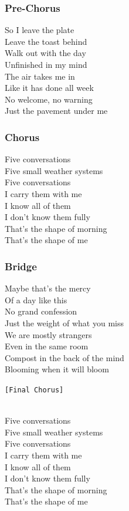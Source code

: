 \subsubsection{Pre-Chorus}\label{pre-chorus-3}

So I leave the plate\\
Leave the toast behind\\
Walk out with the day\\
Unfinished in my mind\\
The air takes me in\\
Like it has done all week\\
No welcome, no warning\\
Just the pavement under me

\subsubsection{Chorus}\label{chorus-11}

Five conversations\\
Five small weather systems\\
Five conversations\\
I carry them with me\\
I know all of them\\
I don't know them fully\\
That's the shape of morning\\
That's the shape of me

\subsubsection{Bridge}\label{bridge-2}

Maybe that's the mercy\\
Of a day like this\\
No grand confession\\
Just the weight of what you miss\\
We are mostly strangers\\
Even in the same room\\
Compost in the back of the mind\\
Blooming when it will bloom

\texttt{{[}Final\ Chorus{]}}\strut \\
Five conversations\\
Five small weather systems\\
Five conversations\\
I carry them with me\\
I know all of them\\
I don't know them fully\\
That's the shape of morning\\
That's the shape of me

